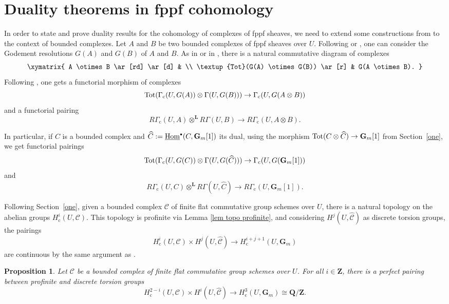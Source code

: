 \documentclass[JEP,XML,SOM,Unicode, NoEqCountersInSection]{cedram}
\let\mathcal\mathscr
\newcommand{\sbullet}{{\scriptscriptstyle\bullet}}
\newcommand{\rc}{\mathrm{c}}
\theoremstyle{plain}
\newtheorem{prop}[theo]{Proposition}
\theoremstyle{definition}
\newcommand \ZZ {\mathbf{Z}}
\newcommand \QQ {\mathbf{Q}}
\newcommand \LL {\mathbf{L}}
\newcommand \Gm {\mathbf{G}_m}\let\G\Gm
\newcommand \cC {\mathcal{C}}
\begin{document}
\section{Duality theorems in fppf cohomology} \label{two}

In order to state and prove duality results for the cohomology of complexes of fppf sheaves, we need to extend some constructions from \cite{DemH} to the context of bounded complexes.
Let $A$ and $B$ be two bounded complexes of fppf sheaves over $U$. Following \cite[XVII,\,4.2.9]{SGA4} or \cite[App.\,A]{friedsus}, one can consider the Godement resolutions $G(A)$ and $G(B)$ of $A$ and $B$. As in \cite[II.6.6]{God} or in \cite[App.\,A]{friedsus}, there is a natural commutative diagram of complexes
\[
\xymatrix{
A \otimes B \ar[rd] \ar[d] & \\
\textup{Tot}(G(A) \otimes G(B)) \ar[r] & G(A \otimes B).
}
\]
Following \cite[Proof of Lem.\,4.1]{DemH}, one gets a functorial morphism of complexes
\begin{equation} \label{cup complexes}
\textup{Tot}(\Gamma_\rc(U, G(A)) \otimes \Gamma(U,G(B))) \to \Gamma_\rc(U,G(A \otimes B))
\end{equation}
and a functorial pairing
\[
R\Gamma_\rc(U,A) \otimes^{\LL} R\Gamma(U,B) \to R\Gamma_\rc(U,A \otimes B).
\]

In particular, if $C$ is a bounded complex and $\widehat{C}:= \underline{\textup{Hom}}^\sbullet(C, \Gm[1])$ its dual, using the morphism $\textup{Tot}(C \otimes \widehat{C}) \to \Gm[1]$ from Section~\ref{one}, we get functorial pairings
\[\textup{Tot}(\Gamma_\rc(U, G(C)) \otimes \Gamma(U,G(\widehat{C}))) \to \Gamma_\rc(U,G(\Gm[1]))
\]
and
\begin{equation} \label{pairing derived}
R\Gamma_\rc(U,C) \otimes^{\LL} R\Gamma(U,\widehat{C}) \to R\Gamma_\rc(U,\Gm[1]).
\end{equation}

Following Section~\ref{one}, given a bounded complex $\cC$ of finite flat commutative group schemes over $U$, there is a natural topology on the abelian groups $H^i_\rc(U, \cC)$. This topology is profinite via Lemma \ref{lem topo profinite}, and considering $H^j(U, \widehat{\cC})$ as discrete torsion groups, the pairings
\[
H^i_\rc(U, \cC) \times H^j(U, \widehat{\cC}) \to H^{i+j+1}_\rc(U, \G)
\]
are continuous by the same argument as \cite[Lem.\,4.4]{DemH}.

\begin{prop} \label{AMM complex}
Let $\cC$ be a bounded complex of finite flat commutative group schemes over $U$.
For all $i \in \ZZ$, there is a perfect pairing between profinite and discrete torsion groups\vspace*{-3pt}
\[
H^{2-i}_\rc(U, \cC) \times H^i(U, \widehat{\cC}) \to H^3_\rc(U,\G) \cong \QQ/\ZZ.
\]
\end{prop}
\end{document}
